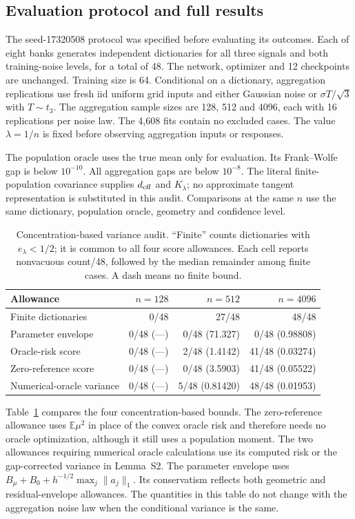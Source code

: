 \documentclass[pdflatex,sn-mathphys-ay]{sn-jnl}
\theoremstyle{remark}\newtheorem{remark}[theorem]{Remark}
\newcommand{\E}{\mathbb E}
\begin{document}
\subsection{Evaluation protocol and full results}
The seed-17320508 protocol was specified before evaluating its outcomes. Each of eight banks generates independent dictionaries for all three signals and both training-noise levels, for a total of 48. The network, optimizer and 12 checkpoints are unchanged. Training size is 64. Conditional on a dictionary, aggregation replications use fresh iid uniform grid inputs and either Gaussian noise or $\sigma T/\sqrt3$ with $T\sim t_3$. The aggregation sample sizes are 128, 512 and 4096, each with 16 replications per noise law. The 4,608 fits contain no excluded cases. The value $\lambda=1/n$ is fixed before observing aggregation inputs or responses.

The population oracle uses the true mean only for evaluation. Its Frank--Wolfe gap is below $10^{-10}$. All aggregation gaps are below $10^{-8}$. The literal finite-population covariance supplies $d_{\rm eff}$ and $K_\lambda$; no approximate tangent representation is substituted in this audit. Comparisons at the same $n$ use the same dictionary, population oracle, geometry and confidence level.

\begin{table}[htbp]\centering\small
\caption{Concentration-based variance audit. ``Finite'' counts dictionaries with $e_\lambda<1/2$; it is common to all four score allowances. Each cell reports nonvacuous count/48, followed by the median remainder among finite cases. A dash means no finite bound.}\label{tab:scorefull}
\begin{tabular}{lrrr}\toprule
Allowance & $n=128$ & $n=512$ & $n=4096$\\\midrule
Finite dictionaries & 0/48 & 27/48 & 48/48\\
Parameter envelope & 0/48 (---) & 0/48 (71.327) & 0/48 (0.98808)\\
Oracle-risk score & 0/48 (---) & 2/48 (1.4142) & 41/48 (0.03274)\\
Zero-reference score & 0/48 (---) & 0/48 (3.5903) & 41/48 (0.05522)\\
Numerical-oracle variance & 0/48 (---) & 5/48 (0.81420) & 48/48 (0.01953)\\\bottomrule
\end{tabular}\end{table}

Table~\ref{tab:scorefull} compares the four concentration-based bounds. The zero-reference allowance uses $\E\mu^2$ in place of the convex oracle risk and therefore needs no oracle optimization, although it still uses a population moment. The two allowances requiring numerical oracle calculations use its computed risk or the gap-corrected variance in Lemma~S2. The parameter envelope uses $B_\mu+B_0+h^{-1/2}\max_j\|a_j\|_1$. Its conservatism reflects both geometric and residual-envelope allowances. The quantities in this table do not change with the aggregation noise law when the conditional variance is the same.
\end{document}
